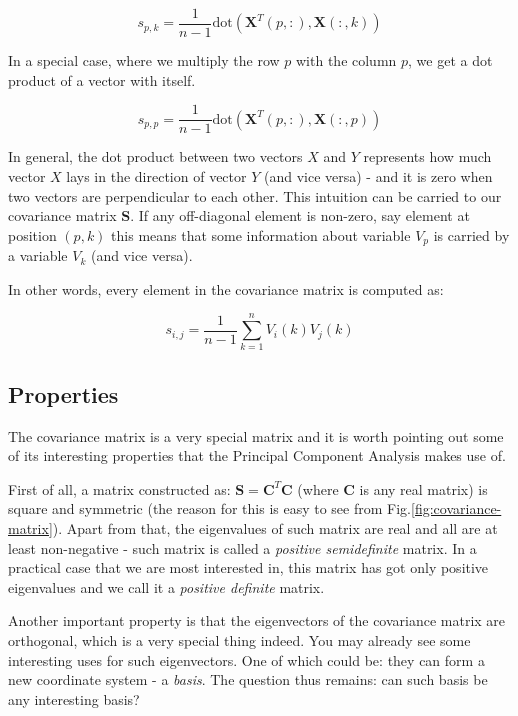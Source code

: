 \documentclass[10pt,twocolumn]{article}
\begin{document}
\begin{equation}
s_{p,k} = \frac{1}{n-1} \text{dot}( \bm{X}^T(p, :), \bm{X}(:,k))
\end{equation}

In a special case, where we multiply the row $p$ with the column $p$, we get a dot product of a vector with itself.

\begin{equation}
s_{p,p} = \frac{1}{n-1} \text{dot}( \bm{X}^T(p, :), \bm{X}(:,p))
\end{equation}

In general, the dot product between two vectors $X$ and $Y$ represents how much vector $X$ lays in the direction of vector $Y$ (and vice versa) - and it is zero when two vectors are perpendicular to each other. This intuition can be carried to our covariance matrix $\bm{S}$. If any off-diagonal element is non-zero, say element at position $(p,k)$ this means that some information about variable $V_p$ is carried by a variable $V_k$ (and vice versa).

In other words, every element in the covariance matrix is computed as:

\begin{equation}
s_{i,j} = \frac{1}{n-1} \sum\limits_{k=1}^n V_i(k) V_j(k)
\end{equation}

\subsection{Properties}

The covariance matrix is a very special matrix and it is worth pointing out some of its interesting properties that the Principal Component Analysis makes use of.

First of all, a matrix constructed as: $\bm{S} = \bm{C}^T \bm{C}$ (where $\bm{C}$ is any real matrix) is square and symmetric (the reason for this is easy to see from Fig.\ref{fig:covariance-matrix}). Apart from that, the eigenvalues of such matrix are real and all are at least non-negative - such matrix is called a \textit{positive semidefinite} matrix. In a practical case that we are most interested in, this matrix has got only positive eigenvalues and we call it a \textit{positive definite} matrix.

Another important property is that the eigenvectors of the covariance matrix are orthogonal, which is a very special thing indeed. You may already see some interesting uses for such eigenvectors. One of which could be: they can form a new coordinate system - a \textit{basis}. The question thus remains: can such basis be any interesting basis?
\end{document}
